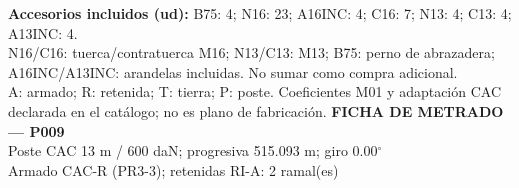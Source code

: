 \begingroup\scriptsize
\textbf{Accesorios incluidos (ud):} B75: 4; N16: 23; A16INC: 4; C16: 7; N13: 4; C13: 4; A13INC: 4.\\
N16/C16: tuerca/contratuerca M16; N13/C13: M13; B75: perno de abrazadera; A16INC/A13INC: arandelas incluidas. No sumar como compra adicional.\\
A: armado; R: retenida; T: tierra; P: poste. Coeficientes M01 y adaptación CAC declarada en el catálogo; no es plano de fabricación.
\endgroup\endgroup
\clearpage{}
\begingroup\small\setlength{\parskip}{3pt}\renewcommand{\arraystretch}{1.05}
\textbf{\large FICHA DE METRADO — P009}\\[4pt]
Poste CAC 13 m / 600 daN; progresiva 515.093 m; giro 0.00\ensuremath{^\circ}\\
Armado CAC-R (PR3-3); retenidas RI-A: 2 ramal(es)\\
\begingroup\scriptsize
